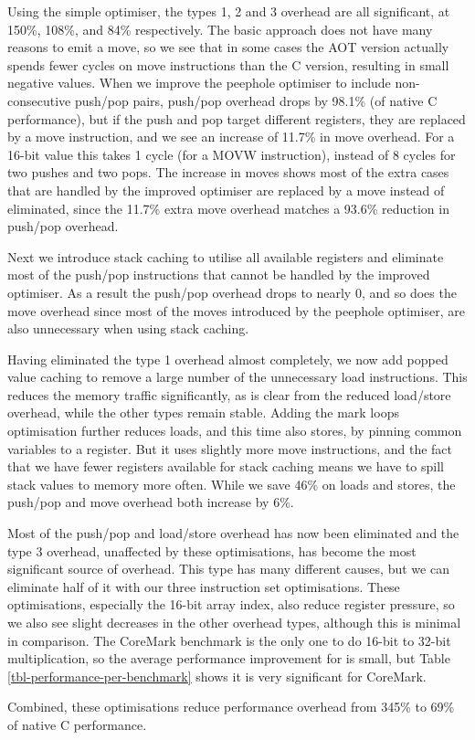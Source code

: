 Using the simple optimiser, the types 1, 2 and 3 overhead are all significant, at 150\%,  108\%, and 84\% respectively. The basic approach does not have many reasons to emit a move, so we see that in some cases the AOT version actually spends fewer cycles on move instructions than the C version, resulting in small negative values. When we improve the peephole optimiser to include non-consecutive push/pop pairs, push/pop overhead drops by 98.1\% (of native C performance), but if the push and pop target different registers, they are replaced by a move instruction, and we see an increase of 11.7\% in move overhead. For a 16-bit value this takes 1 cycle (for a MOVW instruction), instead of 8 cycles for two pushes and two pops. The increase in moves shows most of the extra cases that are handled by the improved optimiser are replaced by a move instead of eliminated, since the 11.7\% extra move overhead matches a 93.6\% reduction in push/pop overhead.

Next we introduce stack caching to utilise all available registers and eliminate most of the push/pop instructions that cannot be handled by the improved optimiser. As a result the push/pop overhead drops to nearly 0, and so does the move overhead since most of the moves introduced by the peephole optimiser, are also unnecessary when using stack caching.

Having eliminated the type 1 overhead almost completely, we now add popped value caching to remove a large number of the unnecessary load instructions. This reduces the memory traffic significantly, as is clear from the reduced load/store overhead, while the other types remain stable. Adding the mark loops optimisation further reduces loads, and this time also stores, by pinning common variables to a register. But it uses slightly more move instructions, and the fact that we have fewer registers available for stack caching means we have to spill stack values to memory more often. While we save 46\% on loads and stores, the push/pop and move overhead both increase by 6\%.

Most of the push/pop and load/store overhead has now been eliminated and the type 3 overhead, unaffected by these optimisations, has become the most significant source of overhead. This type has many different causes, but we can eliminate half of it with our three instruction set optimisations. These optimisations, especially the 16-bit array index, also reduce register pressure, so we also see slight decreases in the other overhead types, although this is minimal in comparison. The CoreMark benchmark is the only one to do 16-bit to 32-bit multiplication, so the average performance improvement for  is small, but Table \ref{tbl-performance-per-benchmark} shows it is very significant for CoreMark.

Combined, these optimisations reduce performance overhead from 345\% to 69\% of native C performance.
